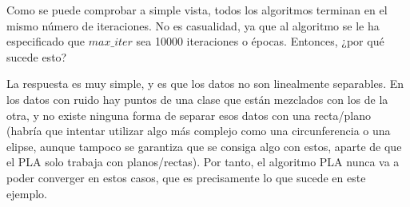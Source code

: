 \documentclass[11pt,a4paper]{article}
\begin{document}
Como se puede comprobar a simple vista, todos los algoritmos terminan en el mismo número de
iteraciones. No es casualidad, ya que al algoritmo se le ha especificado que $max\_iter$ sea
10000 iteraciones o épocas. Entonces, ¿por qué sucede esto?

La respuesta es muy simple, y es que los datos no son linealmente separables. En los datos con ruido
hay puntos de una clase que están mezclados con los de la otra, y no existe ninguna forma de
separar esos datos con una recta/plano (habría que intentar utilizar algo más complejo como una
circunferencia o una elipse, aunque tampoco se garantiza que se consiga algo con estos, aparte de
que el PLA solo trabaja con planos/rectas). Por tanto, el algoritmo PLA nunca va a poder converger en
estos casos, que es precisamente lo que sucede en este ejemplo.
\end{document}
